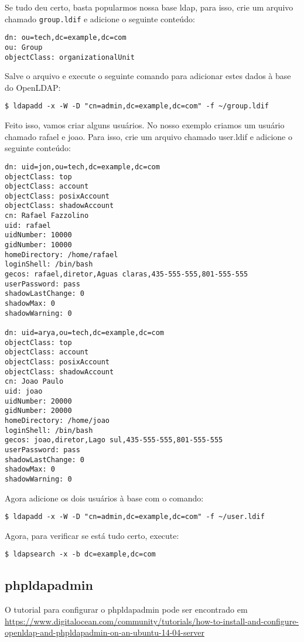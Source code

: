 Se tudo deu certo, basta popularmos nossa base ldap, para isso, crie um arquivo
chamado \verb|group.ldif| e adicione o seguinte conteúdo:
\begin{verbatim}
dn: ou=tech,dc=example,dc=com
ou: Group
objectClass: organizationalUnit
\end{verbatim}

Salve o arquivo e execute o seguinte comando para adicionar estes dados à base do OpenLDAP:
\begin{verbatim}
$ ldapadd -x -W -D "cn=admin,dc=example,dc=com" -f ~/group.ldif
\end{verbatim}

Feito isso, vamos criar alguns usuários. No nosso exemplo criamos um usuário chamado rafael e joao.
Para isso, crie um arquivo chamado user.ldif e adicione o seguinte conteúdo:
\begin{verbatim}
dn: uid=jon,ou=tech,dc=example,dc=com
objectClass: top
objectClass: account
objectClass: posixAccount
objectClass: shadowAccount
cn: Rafael Fazzolino
uid: rafael
uidNumber: 10000
gidNumber: 10000
homeDirectory: /home/rafael
loginShell: /bin/bash
gecos: rafael,diretor,Aguas claras,435-555-555,801-555-555
userPassword: pass
shadowLastChange: 0
shadowMax: 0
shadowWarning: 0

dn: uid=arya,ou=tech,dc=example,dc=com
objectClass: top
objectClass: account
objectClass: posixAccount
objectClass: shadowAccount
cn: Joao Paulo
uid: joao
uidNumber: 20000
gidNumber: 20000
homeDirectory: /home/joao
loginShell: /bin/bash
gecos: joao,diretor,Lago sul,435-555-555,801-555-555
userPassword: pass
shadowLastChange: 0
shadowMax: 0
shadowWarning: 0
\end{verbatim}

Agora adicione os dois usuários à base com o comando:
\begin{verbatim}
$ ldapadd -x -W -D "cn=admin,dc=example,dc=com" -f ~/user.ldif
\end{verbatim}

Agora, para verificar se está tudo certo, execute:

\begin{verbatim}
$ ldapsearch -x -b dc=example,dc=com
\end{verbatim}

\subsection{phpldapadmin}

O tutorial para configurar o phpldapadmin pode ser encontrado em \url{https://www.digitalocean.com/community/tutorials/how-to-install-and-configure-openldap-and-phpldapadmin-on-an-ubuntu-14-04-server}


